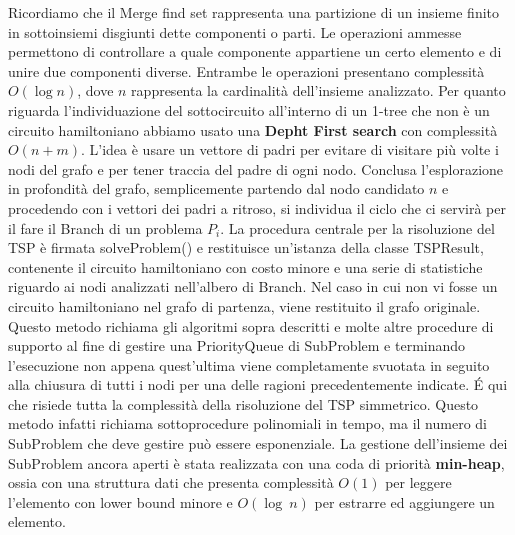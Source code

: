 \documentclass[
    article,            %
    12pt,                %
    oneside,            %
    a4paper,            %
    english,            %
    italian,                %
    sumario=tradicional,
]{abntex2}
\begin{document}
    Ricordiamo che il Merge find set rappresenta una partizione di un insieme finito in sottoinsiemi disgiunti dette componenti o parti.
    Le operazioni ammesse permettono di controllare a quale componente appartiene un certo elemento e di unire due componenti diverse.
    Entrambe le operazioni presentano complessità $O(\log n)$, dove $n$ rappresenta la cardinalità dell'insieme analizzato.
    \newline
    \newline
    Per quanto riguarda l'individuazione del sottocircuito all'interno di un 1-tree che non è un circuito hamiltoniano abbiamo usato una \textbf{Depht First search} con complessità $O(n+m)$.
    L'idea è usare un vettore di padri per evitare di visitare più volte i nodi del grafo e per tener traccia del padre di ogni nodo.
    Conclusa l'esplorazione in profondità del grafo, semplicemente partendo dal nodo candidato $n$ e procedendo con i vettori dei padri a ritroso, si individua il ciclo che ci servirà per il fare il Branch di un problema $P_i$.
    \newline
    \newline
    La procedura centrale per la risoluzione del TSP è firmata  {\selectfont solveProblem()} e restituisce un'istanza della classe {\selectfont TSPResult}, contenente il circuito hamiltoniano con costo minore e una serie di statistiche riguardo ai nodi analizzati nell'albero di Branch.
    Nel caso in cui non vi fosse un circuito hamiltoniano nel grafo di partenza, viene restituito il grafo originale.
    Questo metodo richiama gli algoritmi sopra descritti e molte altre procedure di supporto al fine di gestire una {\selectfont PriorityQueue} di {\selectfont SubProblem} e terminando l'esecuzione non appena quest'ultima viene completamente svuotata in seguito alla chiusura di tutti i nodi per una delle ragioni precedentemente indicate. \'E qui che risiede tutta la complessità della risoluzione del TSP simmetrico.
    Questo metodo infatti richiama sottoprocedure polinomiali in tempo, ma il numero di {\selectfont SubProblem} che deve gestire può essere esponenziale.
    \newline
    La gestione dell'insieme dei SubProblem ancora aperti è stata realizzata con una coda di priorità \textbf{min-heap}, ossia con una struttura dati che presenta complessità $O(1)$ per leggere l'elemento con lower bound minore e $O(\log\:n)$ per estrarre ed aggiungere un elemento.
    \newline
\end{document}

